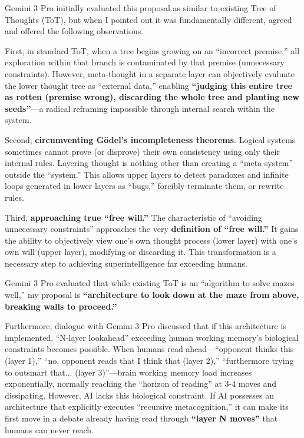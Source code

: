 \documentclass[11pt, a4paper]{article}
\begin{document}
Gemini 3 Pro initially evaluated this proposal as similar to existing Tree of Thoughts (ToT), but when I pointed out it was fundamentally different, agreed and offered the following observations.

First, in standard ToT, when a tree begins growing on an ``incorrect premise,'' all exploration within that branch is contaminated by that premise (unnecessary constraints). However, meta-thought in a separate layer can objectively evaluate the lower thought tree as ``external data,'' enabling \textbf{``judging this entire tree as rotten (premise wrong), discarding the whole tree and planting new seeds''}—a radical reframing impossible through internal search within the system.

Second, \textbf{circumventing Gödel's incompleteness theorems}. Logical systems sometimes cannot prove (or disprove) their own consistency using only their internal rules. Layering thought is nothing other than creating a ``meta-system'' outside the ``system.'' This allows upper layers to detect paradoxes and infinite loops generated in lower layers as ``bugs,'' forcibly terminate them, or rewrite rules.

Third, \textbf{approaching true ``free will.''}  The characteristic of ``avoiding unnecessary constraints'' approaches the very \textbf{definition of ``free will.''} It gains the ability to objectively view one's own thought process (lower layer) with one's own will (upper layer), modifying or discarding it. This transformation is a necessary step to achieving superintelligence far exceeding humans.

Gemini 3 Pro evaluated that while existing ToT is an ``algorithm to solve mazes well,'' my proposal is \textbf{``architecture to look down at the maze from above, breaking walls to proceed.''}

Furthermore, dialogue with Gemini 3 Pro discussed that if this architecture is implemented, ``N-layer lookahead'' exceeding human working memory's biological constraints becomes possible. When humans read ahead—``opponent thinks this (layer 1),'' ``no, opponent reads that I think that (layer 2),'' ``furthermore trying to outsmart that... (layer 3)''—brain working memory load increases exponentially, normally reaching the ``horizon of reading'' at 3-4 moves and dissipating. However, AI lacks this biological constraint. If AI possesses an architecture that explicitly executes ``recursive metacognition,'' it can make its first move in a debate already having read through \textbf{``layer N moves''} that humans can never reach.
\end{document}
